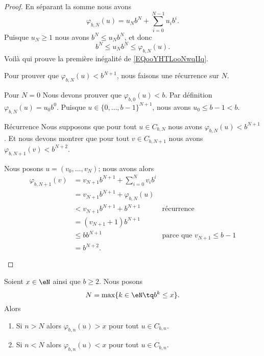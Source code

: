 \begin{proof}
    En séparant la somme nous avons
    \begin{equation}
        \varphi_{b,N}(u)=u_Nb^N+\sum_{i=0}^{N-1}u_ib^i.
    \end{equation}
    Puisque \( u_N\geq 1\) nous avons \( b^N\leq u_Nb^N\), et donc
    \begin{equation}
        b^N\leq u_Nb^N\leq \varphi_{b,N}(u).
    \end{equation}
    Voilà qui prouve la première inégalité de \eqref{EQooYHTLooNwqIIq}.

    Pour prouver que \( \varphi_{b,N}(u)<b^{N+1}\), nous faisons une récurrence sur \( N\).
    \begin{subproof}
    \item[Pour \( N=0\)]
        Nous devons prouver que \( \varphi_{b,0}(u)<b\). Par définition \( \varphi_{b,N}(u)=u_0b^0\). Puisque \( u\in\{ 0,\ldots, b-1 \}^{N+1}\), nous avons \( u_0\leq b-1<b\).
    \item[Récurrence]
        Nous supposons que pour tout \( u\in C_{b,N}\) nous avons \( \varphi_{b,N}(u)<b^{N+1}\). Et nous devons montrer que pour tout \( v\in C_{b,N+1}\) nous avons \( \varphi_{b,N+1}(v)<b^{N+2}\).

        Nous posons \( u=(v_0,\ldots, v_N)\); nous avons alors
        \begin{subequations}
            \begin{align}
                \varphi_{b,N+1}(v)&=v_{N+1}b^{N+1}+\sum_{i=0}^Nv_ib^i\\
                &=v_{N+1}b^{N+1}+\varphi_{b,N}(u)\\
                &<v_{N+1}b^{N+1}+b^{N+1}        &\text{récurrence}\\
                &=(v_{N+1}+1)b^{N+1}\\
                &\leq bb^{N+1}      &\text{parce que }v_{N+1}\leq b-1\\
                &=b^{N+2}.
            \end{align}
        \end{subequations}
    \end{subproof}
\end{proof}

\begin{lemma}        \label{LEMooKDKJooSkhcJS}
    Soient \( x\in \eN\) ainsi que \( b\geq 2\). Nous posons
    \begin{equation}
        N=\max\{ k\in \eN\tq b^k\leq x \}.
    \end{equation}
    Alors
    \begin{enumerate}
        \item
            Si \( n>N\) alors \( \varphi_{b,n}(u)>x\) pour tout \( u\in C_{b,n}\).
        \item
            Si \( n<N\) alors \( \varphi_{b,n}(u)<x\) pour tout \( u\in C_{b,n}\).
    \end{enumerate}
\end{lemma}

